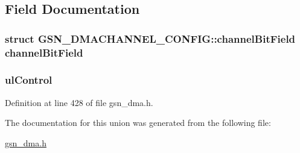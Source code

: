 \subsection{Field Documentation}
\hypertarget{a00052_ab53bac112bdc58b12855e9d3d7f4550e}{
\subsubsection[{channelBitField}]{\setlength{\rightskip}{0pt plus 5cm}struct {\bf GSN\_\-DMACHANNEL\_\-CONFIG::channelBitField} {\bf channelBitField}}}
\label{a00052_ab53bac112bdc58b12855e9d3d7f4550e}
\hypertarget{a00052_a5010fc8f1769629024680e6365279fab}{
\subsubsection[{ulControl}]{ {\bf ulControl}}}
\label{a00052_a5010fc8f1769629024680e6365279fab}


Definition at line 428 of file gsn\_\-dma.h.



The documentation for this union was generated from the following file:\begin{DoxyCompactItemize}
\item 
\hyperlink{a00484}{gsn\_\-dma.h}\end{DoxyCompactItemize}
